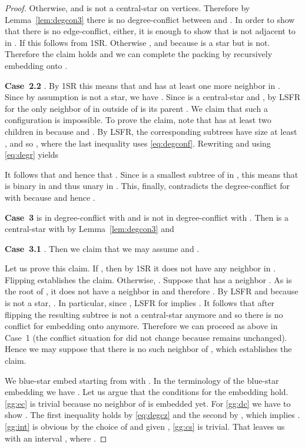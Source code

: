 \documentclass[11pt,a4paper,colorlinks=true,urlcolor=blue,citecolor=red]{article}
\theoremstyle{plain}
\newcommand{\case}[1]{\par\vspace{.5\baselineskip}\noindent\textbf{\sffamily Case~#1}}
\begin{document}
\begin{proof}
  Otherwise,  and 
  is not a central-star on  vertices. Therefore by
  Lemma~\ref{lem:degcon3} there is no degree-conflict between 
  and . In order to show that there is no edge-conflict, either, it
  is enough to show that  is not
  adjacent to  in . If 
  this follows from 1SR. Otherwise
  , and  because
   is a star but  is not. Therefore the claim holds and
  we can complete the packing by recursively embedding  onto
  .

  \case{2.2} . By 1SR this means that 
  and  has at least one more neighbor in . Since by assumption  is not a star, we have . Since  is a central-star and , by LSFR
  for  the only neighbor of  in  outside of  is its
  parent .
We claim that such a configuration is impossible. To prove the claim,
  note that  has at least two children in  because
   and . By LSFR, the corresponding
  subtrees have size at least , and so
,
where the last inequality uses \eqref{eq:degconf}. Rewriting and using
  \eqref{eq:degr} yields

It follows that  and hence that
  . Since  is a smallest subtree of  in ,
  this means that  is binary in  and thus unary in . This,
  finally, contradicts the degree-conflict for  with 
  because  and hence .

  \case{3}  is in degree-conflict with  and 
  is not in degree-conflict with . Then 
  is a central-star  with  by
  Lemma~\ref{lem:degcon3} and



  \case{3.1} . Then we claim that we may
  assume  and .

  Let us prove this claim. If , then by 1SR it does not have
  any neighbor in . Flipping  establishes
  the claim. Otherwise, . Suppose that  has a neighbor
  . As  is the root of
  , it does not have a neighbor in
   and therefore . By LSFR and because
   is not a star, . In particular, since
  , LSFR for  implies . It follows that
  after flipping  the resulting subtree
   is not a central-star anymore and so there
  is no conflict for embedding  onto  anymore. Therefore
  we can proceed as above in Case~1 (the conflict situation for 
  did not change because  remains unchanged). Hence we may
  suppose that there is no such neighbor  of , which establishes
  the claim.

  We blue-star embed  starting from  with
  . In the terminology of the
  blue-star embedding we have . Let us argue that the
  conditions for the embedding hold. \ref{gg:ec} is trivial because no
  neighbor of  is embedded yet. For \ref{gg:dc} we have to show
  . The first inequality holds by
  \eqref{eq:degcz} and the second by
  , which implies
  . \ref{gg:int} is obvious by the
  choice of  and given , \ref{gg:cs} is trivial.
That leaves us with an interval , where .


\end{proof}
\end{document}
